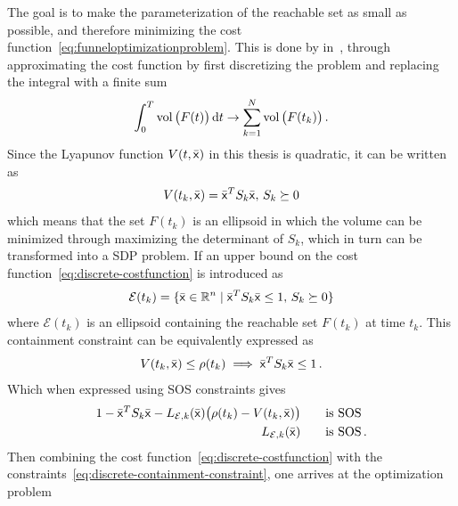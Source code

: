 The goal is to make the parameterization of the reachable set as small as
possible, and therefore minimizing the cost
function~\cref{eq:funneloptimizationproblem}. This is done by
\citeauthor{Tobenkin_2011} in~\cite{Tobenkin_2011}, through approximating the
cost function by first discretizing the problem and replacing the integral with
a finite sum
\begin{equation}
  \int_{0}^{T} \operatorname{vol}\big( F(t) \big) \, \mathrm{d}t \rightarrow \sum_{k=1}^{N} \operatorname{vol}\big( F(t_{k}) \big) \, . \label{eq:discrete-costfunction}
\end{equation}
Since the Lyapunov function \(V(t,\bar{{\mathbf{\mathsf{x}}}})\) in this thesis is quadratic,
it can be written as
\begin{equation}
  V(t_{k}, \bar{{\mathbf{\mathsf{x}}}}) = {\bar{{\mathbf{\mathsf{x}}}}}^{T}S_{k}\bar{{\mathbf{\mathsf{x}}}}, \, S_{k} \succeq 0
\end{equation}
which means that the set \(F(t_{k})\) is an ellipsoid in which the volume can be
minimized through maximizing the determinant of \(S_{k}\), which in turn can be
transformed into a \ac{SDP} problem. If an upper bound on the cost
function~\cref{eq:discrete-costfunction} is introduced as
\begin{equation}
  \mathcal{E} (t_{k}) = \lbrace\bar{{\mathbf{\mathsf{x}}}} \in \mathbb{R}^n \mid {\bar{{\mathbf{\mathsf{x}}}}}^{T}S_{k}\bar{{\mathbf{\mathsf{x}}}} \leq 1, \, S_{k} \succeq 0\rbrace
\end{equation}
where \( \mathcal{E} ( t_{k} ) \) is an ellipsoid containing the reachable set
\( F ( t_{k} ) \) at time \( t_{k} \). This containment constraint can be
equivalently expressed as
\begin{equation}
  V ( t_{k}, \bar{{\mathbf{\mathsf{x}}}} ) \leq \rho(t_{k})  \implies {\bar{{\mathbf{\mathsf{x}}}}}^{T}S_{k}\bar{{\mathbf{\mathsf{x}}}} \leq 1 \, .
  \label{eq:discrete-containment-constraint}
\end{equation}
Which when expressed using \ac{SOS} constraints gives
\begin{align}
  1 - {\bar{{\mathbf{\mathsf{x}}}}}^{T}S_{k}\bar{{\mathbf{\mathsf{x}}}} - L_{\mathcal{E},k}(\bar{{\mathbf{\mathsf{x}}}}) \big( \rho(t_{k}) - V(t_{k}, \bar{{\mathbf{\mathsf{x}}}}) \big)  \qquad \text{is SOS}& \\
  L_{\mathcal{E},k}(\bar{{\mathbf{\mathsf{x}}}}) \qquad \text{is SOS}& \, . \nonumber
\end{align}
%
Then combining the cost function~\cref{eq:discrete-costfunction} with the
constraints~\cref{eq:discrete-containment-constraint}, one arrives at the
optimization problem
%
